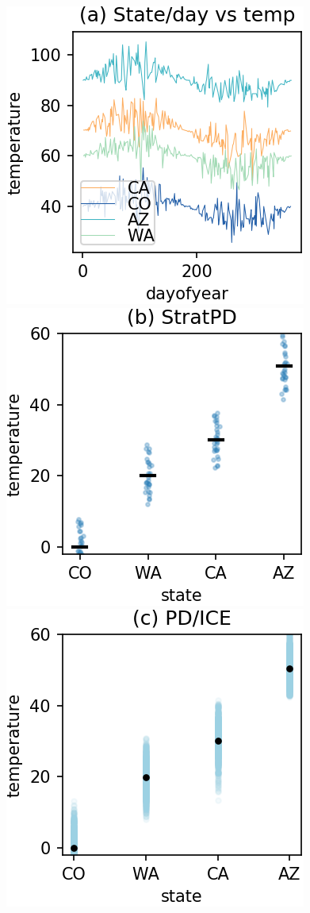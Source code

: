 \documentclass[12pt]{article}
\begin{document}
{\begin{appendices}
\begin{figure}[htbp]
\begin{center}
\includegraphics[scale=0.7]{images/dayofyear_vs_temp.png}
\includegraphics[scale=0.7]{images/state_vs_temp_stratpd.png}
\includegraphics[scale=0.7]{images/state_vs_temp_pdp.png}

\end{center}
\end{figure}
\end{appendices}}
\end{document}
